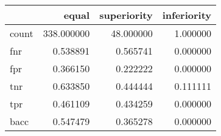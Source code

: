 \begin{tabular}{lrrr}
\toprule
{} &       equal &  superiority &  inferiority \\
\midrule
count &  338.000000 &    48.000000 &     1.000000 \\
fnr   &    0.538891 &     0.565741 &     0.000000 \\
fpr   &    0.366150 &     0.222222 &     0.000000 \\
tnr   &    0.633850 &     0.444444 &     0.111111 \\
tpr   &    0.461109 &     0.434259 &     0.000000 \\
bacc  &    0.547479 &     0.365278 &     0.000000 \\
\bottomrule
\end{tabular}
